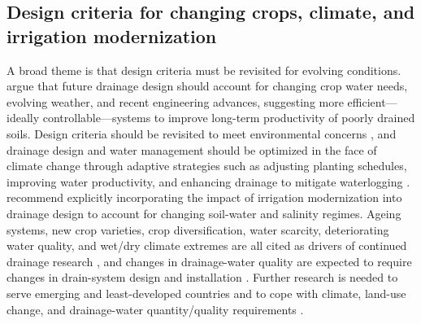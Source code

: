 \documentclass[11pt]{article}
\begin{document}
\subsection{Design criteria for changing crops, climate, and irrigation modernization}
A broad theme is that design criteria must be revisited for evolving conditions. \textcite{Rui2024} argue that future drainage design should account for changing crop water needs, evolving weather, and recent engineering advances, suggesting more efficient---ideally controllable---systems to improve long-term productivity of poorly drained soils. Design criteria should be revisited to meet environmental concerns \parencite{Akram2013}, and drainage design and water management should be optimized in the face of climate change through adaptive strategies such as adjusting planting schedules, improving water productivity, and enhancing drainage to mitigate waterlogging \parencite{Ziaeifar2025}. \textcite{Ritzema2023} recommend explicitly incorporating the impact of irrigation modernization into drainage design to account for changing soil-water and salinity regimes. Ageing systems, new crop varieties, crop diversification, water scarcity, deteriorating water quality, and wet/dry climate extremes are all cited as drivers of continued drainage research \parencite{Ritzema2007}, and changes in drainage-water quality are expected to require changes in drain-system design and installation \parencite{Ritzema2006}. Further research is needed to serve emerging and least-developed countries and to cope with climate, land-use change, and drainage-water quantity/quality requirements \parencite{Ritzema2011}.
\end{document}
